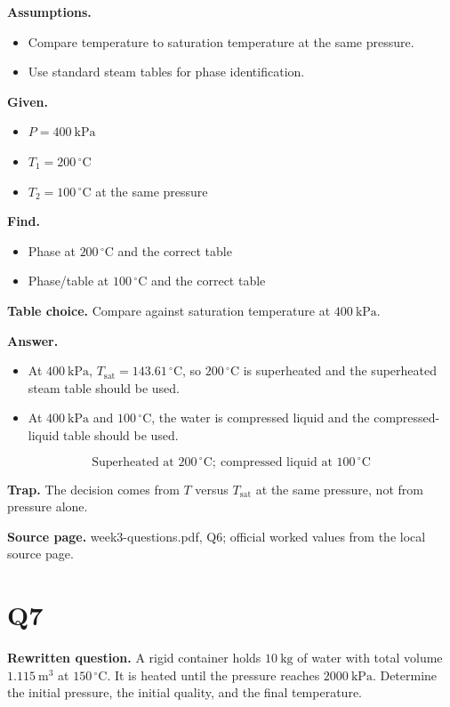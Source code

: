 \textbf{Assumptions.}
\begin{itemize}
  \item Compare temperature to saturation temperature at the same pressure.
  \item Use standard steam tables for phase identification.
\end{itemize}

\textbf{Given.}
\begin{itemize}
  \item $P = 400\ \mathrm{kPa}$
  \item $T_1 = 200\,^{\circ}\mathrm{C}$
  \item $T_2 = 100\,^{\circ}\mathrm{C}$ at the same pressure
\end{itemize}

\textbf{Find.}
\begin{itemize}
  \item Phase at $200\,^{\circ}\mathrm{C}$ and the correct table
  \item Phase/table at $100\,^{\circ}\mathrm{C}$ and the correct table
\end{itemize}

\textbf{Table choice.} Compare against saturation temperature at $400\ \mathrm{kPa}$.

\textbf{Answer.}
\begin{itemize}
  \item At $400\ \mathrm{kPa}$, $T_{\mathrm{sat}} = 143.61\,^{\circ}\mathrm{C}$, so $200\,^{\circ}\mathrm{C}$ is superheated and the superheated steam table should be used.
  \item At $400\ \mathrm{kPa}$ and $100\,^{\circ}\mathrm{C}$, the water is compressed liquid and the compressed-liquid table should be used.
\end{itemize}

\[\boxed{\text{Superheated at }200\,^{\circ}\mathrm{C};\ \text{compressed liquid at }100\,^{\circ}\mathrm{C}}\]

\textbf{Trap.} The decision comes from $T$ versus $T_{\mathrm{sat}}$ at the same pressure, not from pressure alone.

\textbf{Source page.} week3-questions.pdf, Q6; official worked values from the local source page.

\section*{Q7}
\textbf{Rewritten question.} A rigid container holds $10\ \mathrm{kg}$ of water with total volume $1.115\ \mathrm{m^3}$ at $150\,^{\circ}\mathrm{C}$. It is heated until the pressure reaches $2000\ \mathrm{kPa}$. Determine the initial pressure, the initial quality, and the final temperature.

